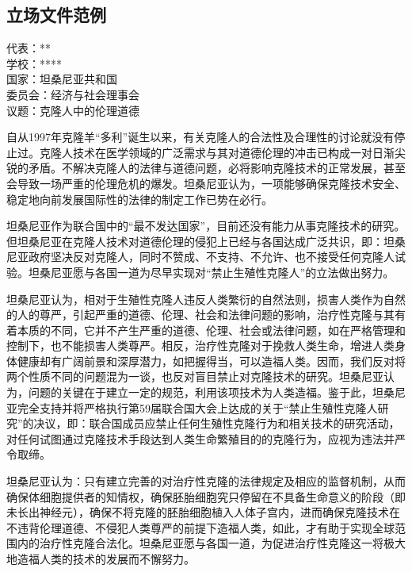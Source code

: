 \documentclass[a4paper,openany]{book}
\begin{document}
\newpage

\subsection{立场文件范例}

\vspace{1em}

\begin{spacing}{1}
\setlength{\parskip}{0em}

\noindent 代表：**\\
学校：****\\
国家：坦桑尼亚共和国\\
委员会：经济与社会理事会\\
议题：克隆人中的伦理道德
 
\vspace{1em} 
 
自从1997年克隆羊“多利”诞生以来，有关克隆人的合法性及合理性的讨论就没有停止过。克隆人技术在医学领域的广泛需求与其对道德伦理的冲击已构成一对日渐尖锐的矛盾。不解决克隆人的法律与道德问题，必将影响克隆技术的正常发展，甚至会导致一场严重的伦理危机的爆发。坦桑尼亚认为，一项能够确保克隆技术安全、稳定地向前发展国际性的法律的制定工作已势在必行。

坦桑尼亚作为联合国中的“最不发达国家”，目前还没有能力从事克隆技术的研究。但坦桑尼亚在克隆人技术对道德伦理的侵犯上已经与各国达成广泛共识，即：坦桑尼亚政府坚决反对克隆人，同时不赞成、不支持、不允许、也不接受任何克隆人试验。坦桑尼亚愿与各国一道为尽早实现对“禁止生殖性克隆人”的立法做出努力。

坦桑尼亚认为，相对于生殖性克隆人违反人类繁衍的自然法则，损害人类作为自然的人的尊严，引起严重的道德、伦理、社会和法律问题的影响，治疗性克隆与其有着本质的不同，它并不产生严重的道德、伦理、社会或法律问题，如在严格管理和控制下，也不能损害人类尊严。相反，治疗性克隆对于挽救人类生命，增进人类身体健康却有广阔前景和深厚潜力，如把握得当，可以造福人类。因而，我们反对将两个性质不同的问题混为一谈，也反对盲目禁止对克隆技术的研究。坦桑尼亚认为，问题的关键在于建立一定的规范，利用该项技术为人类造福。鉴于此，坦桑尼亚完全支持并将严格执行第59届联合国大会上达成的关于“禁止生殖性克隆人研究”的决议，即：联合国成员应禁止任何生殖性克隆行为和相关技术的研究活动，对任何试图通过克隆技术手段达到人类生命繁殖目的的克隆行为，应视为违法并严令取缔。

坦桑尼亚认为：只有建立完善的对治疗性克隆的法律规定及相应的监督机制，从而确保体细胞提供者的知情权，确保胚胎细胞究只停留在不具备生命意义的阶段（即未长出神经元），确保不将克隆的胚胎细胞植入人体子宫内，进而确保克隆技术在不违背伦理道德、不侵犯人类尊严的前提下造福人类，如此，才有助于实现全球范围内的治疗性克隆合法化。坦桑尼亚愿与各国一道，为促进治疗性克隆这一将极大地造福人类的技术的发展而不懈努力。

\end{spacing}
\end{document}
